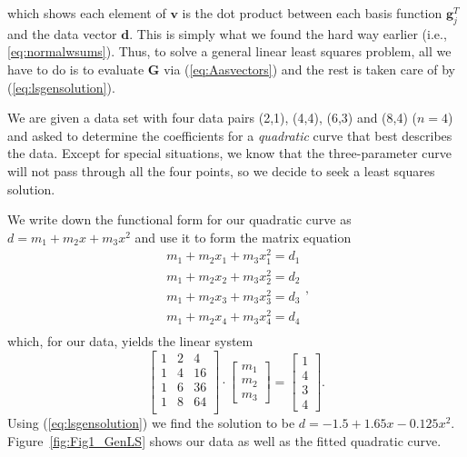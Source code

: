 which shows each element of $\mathbf{v}$ is the dot product between each basis function $\mathbf{g}_j^T$ and the data vector $\mathbf{d}$.
This is simply what we found the hard way earlier (i.e., \ref{eq:normalwsums}).
Thus, to solve a general linear least squares problem, all we have to do is to evaluate $\mathbf{G}$ via (\ref{eq:Aasvectors}) and
the rest is taken care of by (\ref{eq:lsgensolution}).
\begin{example}
We are given a data set with four data pairs (2,1), (4,4), (6,3) and (8,4) ($n = 4$) and asked to determine the
coefficients for a \emph{quadratic} curve that best describes the data.  Except for special situations, we know that the
three-parameter curve will not pass through all the four points, so we decide to seek a least squares solution.

We write down the functional form for our quadratic curve as $d = m_1 + m_2 x + m_3 x^2$ and use it to
form the matrix equation
\begin{equation} \begin{array}{c}
m_1 + m_2 x_1 + m_3 x_1^2 = d_1\\[6pt]
m_1 + m_2 x_2 + m_3 x_2^2 = d_2\\[6pt]
m_1 + m_2 x_3 + m_3 x_3^2 = d_3\\[6pt]
m_1 + m_2 x_4 + m_3 x_4^2 = d_4\\[6pt]
\end{array},
\end{equation}
which, for our data, yields the linear system
\begin{equation}
 \left [
\begin{array}{ccccc}
1 & 2 & 4 \\	 
1 & 4 & 16 \\
1 & 6 & 36 \\
1 & 8 & 64 \\
\end{array} \right ]
\cdot
\left [ \begin{array}{c} 
m_1\\ m_2\\ m_3  \end{array}   \right]
=
\left [ \begin{array}{c} 1\\ 4 \\ 3 \\ 4  \end{array} \right ] .
\end{equation}
Using (\ref{eq:lsgensolution}) we find the solution to be
$d = -1.5 + 1.65 x -0.125x^2$.  Figure~\ref{fig:Fig1_GenLS} shows our data as well as the fitted quadratic curve.
\end{example}

